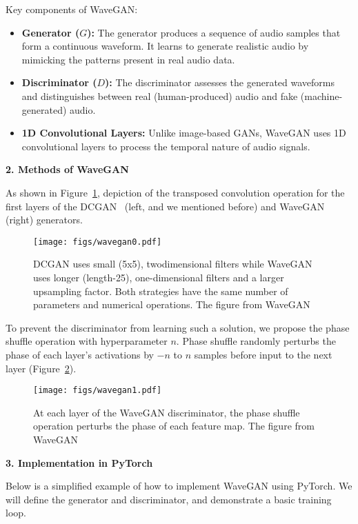Key components of WaveGAN:
\begin{itemize}
    \item \textbf{Generator ($G$):} The generator produces a sequence of audio samples that form a continuous waveform. It learns to generate realistic audio by mimicking the patterns present in real audio data.
    \item \textbf{Discriminator ($D$):} The discriminator assesses the generated waveforms and distinguishes between real (human-produced) audio and fake (machine-generated) audio.
    \item \textbf{1D Convolutional Layers:} Unlike image-based GANs, WaveGAN uses 1D convolutional layers to process the temporal nature of audio signals.
\end{itemize}

\textbf{2. Methods of WaveGAN}

As shown in Figure~\ref{fig:wavegan0}, depiction of the transposed convolution operation for the first layers of the DCGAN~\cite{radford2015unsupervised} (left, and we mentioned before) and WaveGAN~\cite{donahue2018adversarial} (right) generators.

\begin{figure}[htbp]
    \centering
    \texttt{[image: figs/wavegan0.pdf]}
    \caption{DCGAN uses small (5x5), twodimensional filters while WaveGAN uses longer (length-25), one-dimensional filters and a larger upsampling factor. Both strategies have the same number of parameters and numerical operations. The figure from WaveGAN~\cite{donahue2018adversarial}}
    \label{fig:wavegan0}
\end{figure}

To prevent the discriminator from learning such a solution, we propose the phase shuffle operation with hyperparameter $n$. Phase shuffle randomly perturbs the phase of each layer’s activations by $−n$ to $n$ samples before input to the next layer (Figure~\ref{fig:wavegan1}).

\begin{figure}[htbp]
    \centering
    \texttt{[image: figs/wavegan1.pdf]}
    \caption{At each layer of the WaveGAN discriminator, the phase shuffle operation perturbs the phase of each feature map. The figure from WaveGAN~\cite{donahue2018adversarial}}
    \label{fig:wavegan1}
\end{figure}

\textbf{3. Implementation in PyTorch}

Below is a simplified example of how to implement WaveGAN using PyTorch. We will define the generator and discriminator, and demonstrate a basic training loop.

